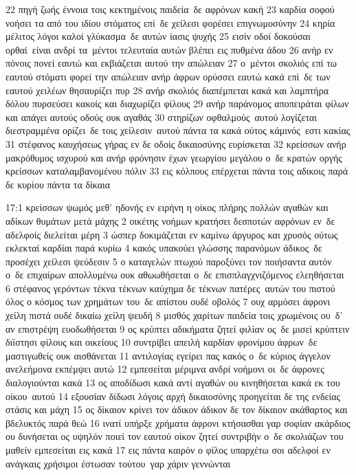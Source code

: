 \documentclass[10pt,oneside,footinclude=true,headinclude=true]{scrbook} %
\begin{document}
22 πηγή ζωής έννοια τοις κεκτημένοις παιδεία δε αφρόνων κακή
23 καρδία σοφού νοήσει τα από του ιδίου στόματος επί δε χείλεσι φορέσει επιγνωμοσύνην
24 κηρία μέλιτος λόγοι καλοί γλύκασμα δε αυτών ίασις ψυχής
25 εισίν οδοί δοκούσαι ορθαί είναι ανδρί τα μέντοι τελευταία αυτών βλέπει εις πυθμένα άδου
26 ανήρ εν πόνοις πονεί εαυτώ και εκβιάζεται αυτού την απώλειαν
27 ο μέντοι σκολιός επί τω εαυτού στόματι φορεί την απώλειαν ανήρ άφρων ορύσσει εαυτώ κακά επί δε των εαυτού χειλέων θησαυρίζει πυρ
28 ανήρ σκολιός διαπέμπεται κακά και λαμπτήρα δόλου πυρσεύσει κακοίς και διαχωρίζει φίλους
29 ανήρ παράνομος αποπειράται φίλων και απάγει αυτούς οδούς ουκ αγαθάς
30 στηρίζων οφθαλμούς αυτού λογίζεται διεστραμμένα ορίζει δε τοις χείλεσιν αυτού πάντα τα κακά ούτος κάμινός εστι κακίας
31 στέφανος καυχήσεως γήρας εν δε οδοίς δικαιοσύνης ευρίσκεται
32 κρείσσων ανήρ μακρόθυμος ισχυρού και ανήρ φρόνησιν έχων γεωργίου μεγάλου ο δε κρατών οργής κρείσσων καταλαμβανομένου πόλιν
33 εις κόλπους επέρχεται πάντα τοις αδικοις παρά δε κυρίου πάντα τα δίκαια
\par
17:1 κρείσσων ψωμός μεθ' ηδονής εν ειρήνη η οίκος πλήρης πολλών αγαθών και αδίκων θυμάτων μετά μάχης
2 οικέτης νοήμων κρατήσει δεσποτών αφρόνων εν δε αδελφοίς διελείται μέρη
3 ώσπερ δοκιμάζεται εν καμίνω άργυρος και χρυσός ούτως εκλεκταί καρδίαι παρά κυρίω
4 κακός υπακούει γλώσσης παρανόμων άδικος δε προσέχει χείλεσι ψεύδεσιν
5 ο καταγελών πτωχού παροξύνει τον ποιήσαντα αυτόν ο δε επιχαίρων απολλυμένω ουκ αθωωθήσεται ο δε επισπλαγχνιζόμενος ελεηθήσεται
6 στέφανος γερόντων τέκνα τέκνων καύχημα δε τέκνων πατέρες αυτών του πιστού όλος ο κόσμος των χρημάτων του δε απίστου ουδέ οβολός
7 ουχ αρμόσει άφρονι χείλη πιστά ουδέ δικαίω χείλη ψευδή
8 μισθός χαρίτων παιδεία τοις χρωμένοις ου δ' αν επιστρέψη ευοδωθήσεται
9 ος κρύπτει αδικήματα ζητεί φιλίαν ος δε μισεί κρύπτειν διϊστησι φίλους και οικείους
10 συντρίβει απειλή καρδίαν φρονίμου άφρων δε μαστιγωθείς ουκ αισθάνεται
11 αντιλογίας εγείρει πας κακός ο δε κύριος άγγελον ανελεήμονα εκπέμψει αυτώ
12 εμπεσείται μέριμνα ανδρί νοήμονι οι δε άφρονες διαλογιούνται κακά
13 ος αποδίδωσι κακά αντί αγαθών ου κινηθήσεται κακά εκ του οίκου αυτού
14 εξουσίαν δίδωσι λόγοις αρχή δικαιοσύνης προηγείται δε της ενδείας στάσις και μάχη
15 ος δίκαιον κρίνει τον άδικον άδικον δε τον δίκαιον ακάθαρτος και βδελυκτός παρά θεώ
16 ινατί υπήρξε χρήματα άφρονι κτήσασθαι γαρ σοφίαν ακάρδιος ου δυνήσεται ος υψηλόν ποιεί τον εαυτού οίκον ζητεί συντριβήν ο δε σκολιάζων του μαθείν εμπεσείται εις κακά
17 εις πάντα καιρόν ο φίλος υπαρχέτω σοι αδελφοί εν ανάγκαις χρήσιμοι έστωσαν τούτου γαρ χάριν γεννώνται
\end{document}
